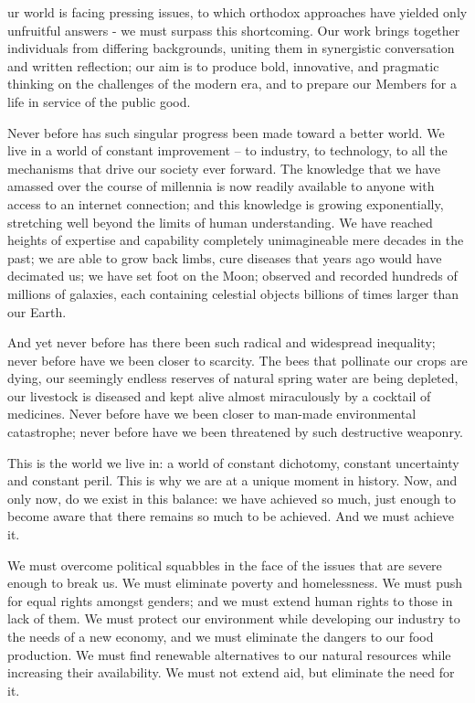 

   ur world is facing pressing issues, to which orthodox approaches have
   yielded only unfruitful answers - we must surpass this shortcoming. Our
   work brings together individuals from differing backgrounds, uniting
   them in synergistic conversation and written reflection; our aim is to
   produce bold, innovative, and pragmatic thinking on the challenges of
   the modern era, and to prepare our Members for a life in service of the
   public good.

   Never before has such singular progress been made toward a better
   world. We live in a world of constant improvement -- to industry, to
   technology, to all the mechanisms that drive our society ever forward.
   The knowledge that we have amassed over the course of millennia is now
   readily available to anyone with access to an internet connection; and
   this knowledge is growing exponentially, stretching well beyond the
   limits of human understanding. We have reached heights of expertise and
   capability completely unimagineable mere decades in the past; we are
   able to grow back limbs, cure diseases that years ago would have
   decimated us; we have set foot on the Moon; observed and recorded
   hundreds of millions of galaxies, each containing celestial objects
   billions of times larger than our Earth.

   And yet never before has there been such radical and widespread
   inequality; never before have we been closer to scarcity. The bees that
   pollinate our crops are dying, our seemingly endless reserves of
   natural spring water are being depleted, our livestock is diseased and
   kept alive almost miraculously by a cocktail of medicines. Never before
   have we been closer to man-made environmental catastrophe; never before
   have we been threatened by such destructive weaponry.

   This is the world we live in: a world of constant dichotomy, constant
   uncertainty and constant peril. This is why we are at a unique moment
   in history. Now, and only now, do we exist in this balance: we have
   achieved so much, just enough to become aware that there remains so
   much to be achieved. And we must achieve it.

   We must overcome political squabbles in the face of the issues that are
   severe enough to break us. We must eliminate poverty and homelessness.
   We must push for equal rights amongst genders; and we must extend human
   rights to those in lack of them. We must protect our environment while
   developing our industry to the needs of a new economy, and we must
   eliminate the dangers to our food production. We must find renewable
   alternatives to our natural resources while increasing their
   availability. We must not extend aid, but eliminate the need for it.


